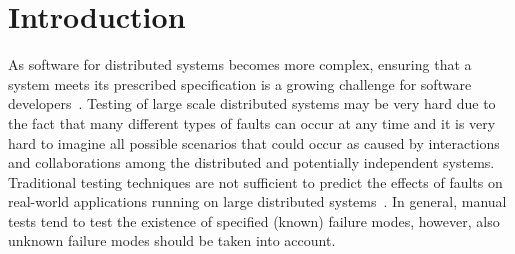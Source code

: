 \section{Introduction}
    
 
    
    
As software for distributed systems becomes more complex, ensuring that a system meets its prescribed specification is a growing challenge for software developers~\cite{dawson1996testing}. Testing of large scale distributed systems may be very hard due to the fact that many different types of faults  can occur at any time  and it is very hard to imagine all possible scenarios that could occur as caused by interactions and collaborations among the distributed and potentially independent systems. 
Traditional testing techniques are not sufficient to predict the effects of faults on real-world applications running on large distributed systems~\cite{FaaS}. In general, manual 
tests tend to test the existence of specified (known) failure modes, however, also %
unknown failure modes  should be taken into account.

